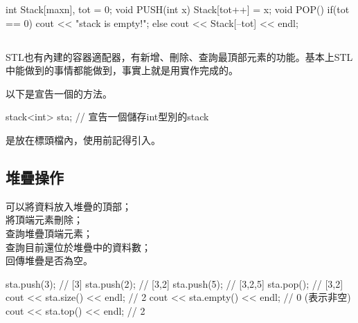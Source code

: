 \documentclass[main.tex]{subfiles}
\begin{document}
\begin{C++}
int Stack[maxn], tot = 0;
void PUSH(int x) {
    Stack[tot++] = x;
}
void POP(){
    if(tot == 0)
        cout << "stack is empty!\n";
    else
        cout << Stack[--tot] << endl;
}
\end{C++}
\subsection{}
STL也有內建的容器適配器，有新增、刪除、查詢最頂部元素的功能。基本上STL中能做到的事情都能做到，事實上就是用實作完成的。\\


以下是宣告一個的方法。
\begin{C++}
stack<int> sta; // 宣告一個儲存int型別的stack
\end{C++}
\indent {}是放在標頭檔內，使用前記得引入。

\subsection{堆疊操作}
 可以將資料放入堆疊的頂部；\\
\indent{} 將頂端元素刪除；\\
\indent{} 查詢堆疊頂端元素；\\
\indent{} 查詢目前還位於堆疊中的資料數；\\
\indent{} 回傳堆疊是否為空。
\begin{C++}
sta.push(3); // [3]
sta.push(2); // [3,2]
sta.push(5); // [3,2,5]
sta.pop(); // [3,2]
cout << sta.size() << endl; // 2
cout << sta.empty() << endl; // 0 (表示非空)
cout << sta.top() << endl; // 2
\end{C++}
\end{document}
